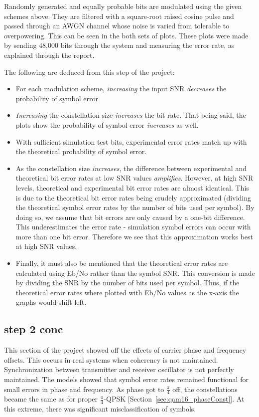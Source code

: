 \documentclass[]{article}
\begin{document}
Randomly generated and equally probable bits are modulated using the given schemes above.  They are filtered with a square-root raised cosine pulse and passed through an AWGN channel whose noise is varied from tolerable to overpowering.  This can be seen in the both sets of plots.  These plots were made by sending 48,000 bits through the system and measuring the error rate, as explained through the report.

The following are deduced from this step of the project:
\begin{itemize}
\item For each modulation scheme, \emph{increasing} the input SNR \emph{decreases} the probability of symbol error
\item \emph{Increasing} the constellation size \emph{increases} the bit rate.  That being said, the plots show the probability of symbol error \emph{increases} as well.
\item With sufficient simulation test bits, experimental error rates match up with  the theoretical probability of symbol error. 
\item As the constellation size \emph{increases}, the difference between experimental and theoretical bit error rates at low SNR values \emph{amplifies}. However, at high SNR levels, theoretical and experimental bit error rates are almost identical. This is due to the theoretical bit error rates being crudely approximated (dividing the theoretical symbol error rates by the number of bits used per symbol). By doing so, we assume that bit errors are only caused by a one-bit difference.  This underestimates the error rate - simulation symbol errors can occur with more than one bit error. Therefore we see that this approximation works best at high SNR values. 
\item Finally, it must also be mentioned that the theoretical error rates are calculated using Eb/No rather than the symbol SNR. This conversion is made by dividing the SNR by the number of bits used per symbol. Thus, if the theoretical error rates where plotted with Eb/No values as the x-axis the graphs would shift left.  

\end{itemize}


\subsection{step 2 conc}
This section of the project showed off the effects of carrier phase and frequency offsets.  This occurs in real systems when coherency is not maintained.  Synchronization between transmitter and receiver oscillator is not perfectly maintained.  The models showed that symbol error rates remained functional for small errors in phase and frequency.  As phase got to $\frac{\pi}{4}$ off, the constellations became the same as for proper $\frac{\pi}{4}$-QPSK [Section~\ref{sec:qam16_phaseConst}].  At this extreme, there was significant misclassification of symbols.  \\
\end{document}
